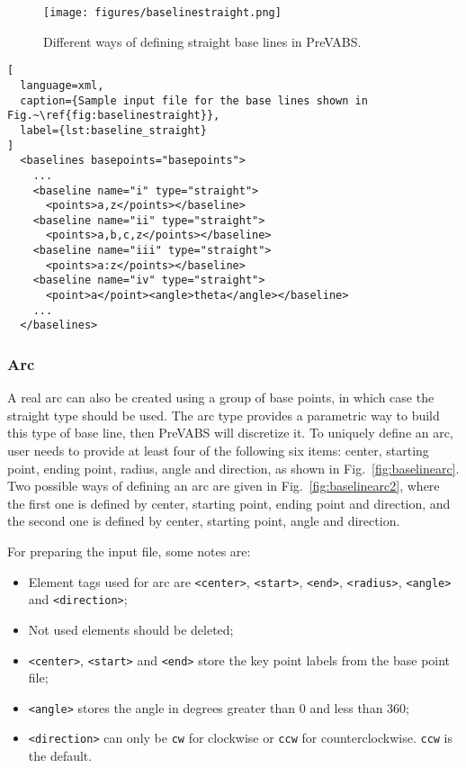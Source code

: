 \documentclass{book}
\begin{document}
\begin{figure}
  \centerline{\texttt{[image: figures/baselinestraight.png]}}
  \caption{Different ways of defining straight base lines in PreVABS.}
  \label{fig:baselinestraight}
\end{figure}

\begin{lstlisting}[
  language=xml,
  caption={Sample input file for the base lines shown in Fig.~\ref{fig:baselinestraight}},
  label={lst:baseline_straight}
]
  <baselines basepoints="basepoints">
    ...
    <baseline name="i" type="straight">
      <points>a,z</points></baseline>
    <baseline name="ii" type="straight">
      <points>a,b,c,z</points></baseline>
    <baseline name="iii" type="straight">
      <points>a:z</points></baseline>
    <baseline name="iv" type="straight">
      <point>a</point><angle>theta</angle></baseline>
    ...
  </baselines>
\end{lstlisting}

\subsubsection{Arc}

A real arc can also be created using a group of base points, in which 
case the straight type should be used. The arc type provides a parametric 
way to build this type of base line, then PreVABS will discretize it. 
To uniquely define an arc, user needs to provide at least four of the 
following six items: center, starting point, ending point, radius, angle 
and direction, as shown in Fig.~\ref{fig:baselinearc}. Two possible ways 
of defining an arc are given in Fig.~\ref{fig:baselinearc2}, where the 
first one is defined by center, starting point, ending point and direction, 
and the second one is defined by center, starting point, angle and direction.

For preparing the input file, some notes are:
\begin{itemize}
  \item Element tags used for arc are \lstinline{<center>}, \lstinline{<start>}, 
    \lstinline{<end>}, \lstinline{<radius>}, \lstinline{<angle>} and 
    \lstinline{<direction>};
  \item Not used elements should be deleted;
  \item \lstinline{<center>}, \lstinline{<start>} and \lstinline{<end>} 
    store the key point labels from the base point file;
  \item \lstinline{<angle>} stores the angle in degrees greater than 0 
    and less than 360;
  \item \lstinline{<direction>} can only be \lstinline{cw} for clockwise 
    or \lstinline{ccw} for counterclockwise. \lstinline{ccw} is the default.
\end{itemize}
\end{document}
